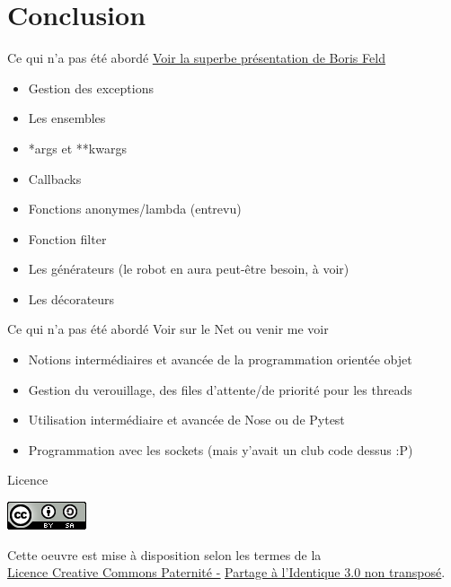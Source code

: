 \documentclass{beamer}
\begin{document}
\section{Conclusion}

\begin{frame}{Ce qui n'a pas été abordé}
\underline{\href{http://feldboris.alwaysdata.net/blog/pages/presentations/pythonutbm}{Voir la superbe présentation de Boris Feld}}
\begin{itemize}
 \item Gestion des exceptions
 \item Les ensembles
 \item *args et **kwargs
 \item Callbacks
 \item Fonctions anonymes/lambda (entrevu)
 \item Fonction filter
 \item Les générateurs (le robot en aura peut-être besoin, à voir)
 \item Les décorateurs
\end{itemize}
\end{frame}

\begin{frame}{Ce qui n'a pas été abordé}
Voir sur le Net ou venir me voir
\begin{itemize}
 \item Notions intermédiaires et avancée de la programmation orientée objet
 \item Gestion du verouillage, des files d'attente/de priorité pour les threads
 \item Utilisation intermédiaire et avancée de Nose ou de Pytest
 \item Programmation avec les sockets (mais y'avait un club code dessus :P)
\end{itemize}
\end{frame}

\begin{frame}{Licence}
\begin{center}
 \includegraphics{./88x31.png}
\end{center}
\vspace{20px}
Cette oeuvre est mise à disposition selon les termes de la\\
\underline{\href{http://creativecommons.org/licenses/by-sa/3.0/}{Licence Creative Commons Paternité -}}
\underline{\href{http://creativecommons.org/licenses/by-sa/3.0/}{Partage à l'Identique 3.0 non transposé}}.

\end{frame}
\end{document}
